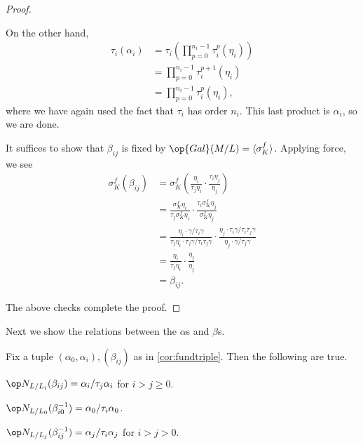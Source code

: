 \begin{proof}
\begin{listalph}
		On the other hand,
		\begin{align*}
			\tau_i(\alpha_i) &= \tau_i\left(\prod_{p=0}^{n_i-1}\tau_i^p\left(\eta_i\right)\right) \\
			&= \prod_{p=0}^{n_i-1}\tau_i^{p+1}\left(\eta_i\right) \\
			&= \prod_{p=0}^{n_i-1}\tau_i^p\left(\eta_i\right),
		\end{align*}
		where we have again used the fact that $\tau_i$ has order $n_i$. This last product is $\alpha_i$, so we are done.
		\item It suffices to show that $\beta_{ij}$ is fixed by $\op{Gal}(M/L)=\langle\sigma_K^f\rangle$. Applying force, we see
		\begin{align*}
			\sigma_K^f(\beta_{ij}) &= \sigma_K^f\left(\frac{\eta_{i}}{\tau_j\eta_i}\cdot\frac{\tau_i\eta_j}{\eta_{j}}\right) \\
			&= \frac{\sigma_K^f\eta_{i}}{\tau_j\sigma_K^f\eta_i}\cdot\frac{\tau_i\sigma_K^f\eta_j}{\sigma_K^f\eta_{j}} \\
			&= \frac{\eta_i\cdot\gamma/\tau_i\gamma}{\tau_j\eta_i\cdot\tau_j\gamma/\tau_i\tau_j\gamma}\cdot
			\frac{\eta_j\cdot\tau_i\gamma/\tau_i\tau_j\gamma}{\eta_j\cdot\gamma/\tau_j\gamma} \\
			&= \frac{\eta_i}{\tau_j\eta_i}\cdot
			\frac{\eta_j}{\eta_j} \\
			&= \beta_{ij}.
		\end{align*}
	\end{listalph}
	The above checks complete the proof.
\end{proof}
Next we show the relations between the $\alpha$s and $\beta$s.
\begin{lemma}
	Fix a tuple $(\alpha_0,\alpha_i),(\beta_{ij})$ as in \autoref{cor:fundtriple}. Then the following are true.
	\begin{listalph}
		\item $\op N_{L/L_i}(\beta_{ij})=\alpha_i/\tau_j\alpha_i$ for $i>j\ge0$.
		\item $\op N_{L/L_0}(\beta_{i0}^{-1})=\alpha_0/\tau_i\alpha_0$.
		\item $\op N_{L/L_j}(\beta_{ij}^{-1})=\alpha_j/\tau_i\alpha_j$ for $i>j>0$.
	\end{listalph}
\end{lemma}
